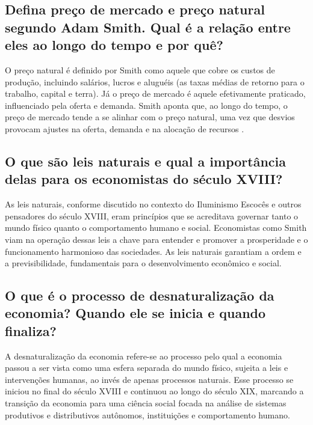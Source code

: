 \documentclass[a4paper,12pt]{article}[abntex2]
\begin{document}
\subsection{\textbf{Defina preço de mercado e preço natural segundo Adam Smith. Qual é a relação entre eles ao longo do tempo e por quê?}}
O preço natural é definido por Smith como aquele que cobre os custos de produção, incluindo salários, lucros e aluguéis (as taxas médias de retorno para o trabalho, capital e terra). Já o preço de mercado é aquele efetivamente praticado, influenciado pela oferta e demanda. Smith aponta que, ao longo do tempo, o preço de mercado tende a se alinhar com o preço natural, uma vez que desvios provocam ajustes na oferta, demanda e na alocação de recursos .
\subsection{\textbf{O que são leis naturais e qual a importância delas para os economistas do século XVIII?}}
As leis naturais, conforme discutido no contexto do Iluminismo Escocês e outros pensadores do século XVIII, eram princípios que se acreditava governar tanto o mundo físico quanto o comportamento humano e social. Economistas como Smith viam na operação dessas leis a chave para entender e promover a prosperidade e o funcionamento harmonioso das sociedades. As leis naturais garantiam a ordem e a previsibilidade, fundamentais para o desenvolvimento econômico e social.
\subsection{\textbf{O que é o processo de desnaturalização da economia? Quando ele se inicia e quando finaliza?}}
A desnaturalização da economia refere-se ao processo pelo qual a economia passou a ser vista como uma esfera separada do mundo físico, sujeita a leis e intervenções humanas, ao invés de apenas processos naturais. Esse processo se iniciou no final do século XVIII e continuou ao longo do século XIX, marcando a transição da economia para uma ciência social focada na análise de sistemas produtivos e distributivos autônomos, instituições e comportamento humano.
\end{document}
